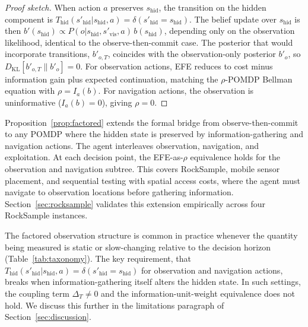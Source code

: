 \documentclass[runningheads]{llncs}
\begin{document}
\begin{proof}[Proof sketch]
When action $a$ preserves $s_{\mathrm{hid}}$, the transition on the hidden component is $T_{\mathrm{hid}}(s'_{\mathrm{hid}} | s_{\mathrm{hid}}, a) = \delta(s'_{\mathrm{hid}} = s_{\mathrm{hid}})$. The belief update over $s_{\mathrm{hid}}$ is then $b'(s_{\mathrm{hid}}) \propto P(o | s_{\mathrm{hid}}, s'_{\mathrm{vis}}, a)\, b(s_{\mathrm{hid}})$, depending only on the observation likelihood, identical to the observe-then-commit case. The posterior that would incorporate transitions, $b'_{o,T}$, coincides with the observation-only posterior $b'_o$, so $D_{\mathrm{KL}}[b'_{o,T} \| b'_o] = 0$. For observation actions, EFE reduces to cost minus information gain plus expected continuation, matching the $\rho$-POMDP Bellman equation with $\rho = I_a(b)$. For navigation actions, the observation is uninformative ($I_a(b) = 0$), giving $\rho = 0$.
\end{proof}

Proposition~\ref{prop:factored} extends the formal bridge from observe-then-commit to any POMDP where the hidden state is preserved by information-gathering and navigation actions. The agent interleaves observation, navigation, and exploitation. At each decision point, the EFE-as-$\rho$ equivalence holds for the observation and navigation subtree. This covers RockSample, mobile sensor placement, and sequential testing with spatial access costs, where the agent must navigate to observation locations before gathering information. Section~\ref{sec:rocksample} validates this extension empirically across four RockSample instances.

The factored observation structure is common in practice whenever the quantity being measured is static or slow-changing relative to the decision horizon (Table~\ref{tab:taxonomy}). The key requirement, that $T_{\mathrm{hid}}(s'_{\mathrm{hid}} | s_{\mathrm{hid}}, a) = \delta(s'_{\mathrm{hid}} = s_{\mathrm{hid}})$ for observation and navigation actions, breaks when information-gathering itself alters the hidden state. In such settings, the coupling term $\Delta_T \neq 0$ and the information-unit-weight equivalence does not hold. We discuss this further in the limitations paragraph of Section~\ref{sec:discussion}.
\end{document}
